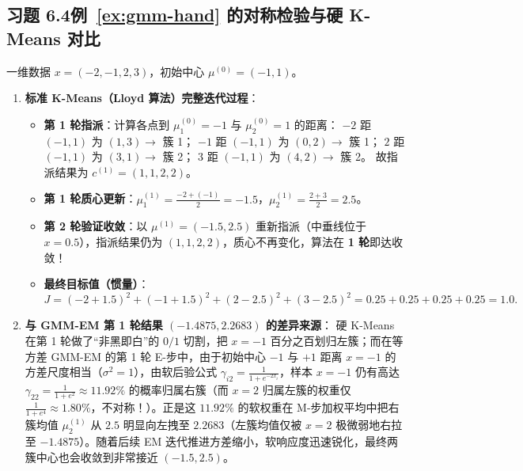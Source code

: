 \subsection*{习题 6.4\quad 例~\ref{ex:gmm-hand} 的对称检验与硬 K-Means 对比}
一维数据 $x = (-2, -1, 2, 3)$，初始中心 $\mu^{(0)} = (-1, 1)$。
\begin{enumerate}[label=(\arabic*), leftmargin=1.8em]
  \item \textbf{标准 K-Means（Lloyd 算法）完整迭代过程}：
  \begin{itemize}
    \item \textbf{第 1 轮指派}：计算各点到 $\mu_1^{(0)} = -1$ 与 $\mu_2^{(0)} = 1$ 的距离：
    $-2$ 距 $(-1, 1)$ 为 $(1, 3) \to$ 簇 1；
    $-1$ 距 $(-1, 1)$ 为 $(0, 2) \to$ 簇 1；
    $2$ 距 $(-1, 1)$ 为 $(3, 1) \to$ 簇 2；
    $3$ 距 $(-1, 1)$ 为 $(4, 2) \to$ 簇 2。
    故指派结果为 $c^{(1)} = (1, 1, 2, 2)$。
    \item \textbf{第 1 轮质心更新}：$\mu_1^{(1)} = \frac{-2 + (-1)}{2} = \mathbf{-1.5}$，$\mu_2^{(1)} = \frac{2 + 3}{2} = \mathbf{2.5}$。
    \item \textbf{第 2 轮验证收敛}：以 $\mu^{(1)} = (-1.5, 2.5)$ 重新指派（中垂线位于 $x = 0.5$），指派结果仍为 $(1, 1, 2, 2)$，质心不再变化，算法在 \textbf{1 轮}即达收敛！
    \item \textbf{最终目标值（惯量）}：
    \[
      J = (-2 + 1.5)^2 + (-1 + 1.5)^2 + (2 - 2.5)^2 + (3 - 2.5)^2 = 0.25 + 0.25 + 0.25 + 0.25 = \mathbf{1.0}.
    \]
  \end{itemize}
  \item \textbf{与 GMM-EM 第 1 轮结果 $(-1.4875, 2.2683)$ 的差异来源}：
  硬 K-Means 在第 1 轮做了“非黑即白”的 $0/1$ 切割，把 $x = -1$ 百分之百划归左簇；而在等方差 GMM-EM 的第 1 轮 E-步中，由于初始中心 $-1$ 与 $+1$ 距离 $x = -1$ 的方差尺度相当（$\sigma^2 = 1$），由软后验公式 $\gamma_{i2} = \frac{1}{1 + e^{-2x_i}}$，样本 $x = -1$ 仍有高达 $\gamma_{22} = \frac{1}{1 + e^{2}} \approx \mathbf{11.92\%}$ 的概率归属右簇（而 $x = 2$ 归属左簇的权重仅 $\frac{1}{1+e^4} \approx 1.80\%$，不对称！）。正是这 $11.92\%$ 的软权重在 M-步加权平均中把右簇均值 $\mu_2^{(1)}$ 从 $2.5$ 明显向左拽至 $2.2683$（左簇均值仅被 $x=2$ 极微弱地右拉至 $-1.4875$）。随着后续 EM 迭代推进方差缩小，软响应度迅速锐化，最终两簇中心也会收敛到非常接近 $(-1.5, 2.5)$。
\end{enumerate}

